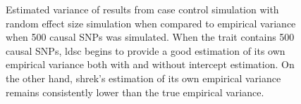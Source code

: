 \begin{figure}
{				
				\label{fig:ldscInCC500RandVarCom}
			}
			\caption[Estimation of Variance in Case Control Simulation (500 Causal)]
			{Estimated variance of results from case control simulation with random effect size simulation when compared to empirical variance when 500 causal \glspl{SNP} was simulated.
				When the trait contains 500 causal \glspl{SNP}, \gls{ldsc} begins to provide a good estimation of its own empirical variance both with and without intercept estimation. 
				On the other hand, \gls{shrek}'s estimation of its own empirical variance remains consistently lower than the true empirical variance.
			} 
			\label{fig:CC500RandVarCom}
		\end{figure}